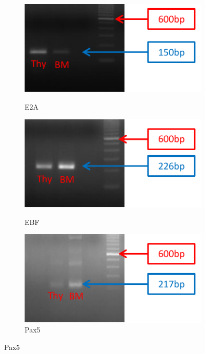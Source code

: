 \begin{figure}
	\begin{subfigure}{0.5\textwidth}
	\centering
	\caption{E2A}
	\includegraphics[width=\textwidth]{Figures/E2A.pdf}
	\label{subfig:E2A}
	\end{subfigure}
	\begin{subfigure}{0.5\textwidth}
	\centering
	\caption{EBF}
	\includegraphics[width=\textwidth]{Figures/EBF.pdf}
	\label{subfig:EBF}
	\end{subfigure}
	\begin{subfigure}{0.5\textwidth}
	\centering
	\caption{Pax5}
	\includegraphics[width=\textwidth]{Figures/sPax5.pdf}

\end{subfigure}
\end{figure}
